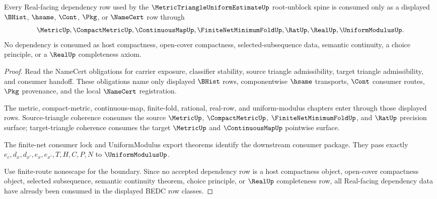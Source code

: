 \begin{theorem}
\label{thm:metric-triangle-uniform-estimate-l10-dependency-readiness}
Every Real-facing dependency row used by the $\MetricTriangleUniformEstimateUp$ root-unblock spine is consumed only as a displayed $\BHist$, $\hsame$, $\Cont$, $\Pkg$, or $\NameCert$ row through
$$
\MetricUp,\CompactMetricUp,\ContinuousMapUp,\FiniteNetMinimumFoldUp,\RatUp,\RealUp,\UniformModulusUp.
$$
No dependency is consumed as host compactness, open-cover compactness, selected-subsequence data, semantic continuity, a choice principle, or a $\RealUp$ completeness axiom.
\end{theorem}
\begin{proof}
Read the NameCert obligations for carrier exposure, classifier stability, source triangle admissibility, target triangle admissibility, and consumer handoff. These obligations name only displayed $\BHist$ rows, componentwise $\hsame$ transports, $\Cont$ consumer routes, $\Pkg$ provenance, and the local $\NameCert$ registration.

The metric, compact-metric, continuous-map, finite-fold, rational, real-row, and uniform-modulus chapters enter through those displayed rows. Source-triangle coherence consumes the source $\MetricUp$, $\CompactMetricUp$, $\FiniteNetMinimumFoldUp$, and $\RatUp$ precision surface; target-triangle coherence consumes the target $\MetricUp$ and $\ContinuousMapUp$ pointwise surface.

The finite-net consumer lock and UniformModulus export theorems identify the downstream consumer package. They pass exactly $e_c,d_x,d_{x'},e_x,e_{x'},T,H,C,P,N$ to $\UniformModulusUp$.

Use finite-route nonescape for the boundary. Since no accepted dependency row is a host compactness object, open-cover compactness object, selected subsequence, semantic continuity theorem, choice principle, or $\RealUp$ completeness row, all Real-facing dependency data have already been consumed in the displayed BEDC row classes.
\end{proof}

